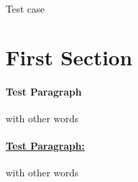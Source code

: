 \documentclass[11pt]{NSFtest}
\newcommand{\Upara}[1]{\paragraph*{\underline{\upshape #1:}}}
\begin{document}
Test case

\section{First Section}

\paragraph*{Test Paragraph} with other words

\Upara{Test Paragraph} with other words
\end{document}
